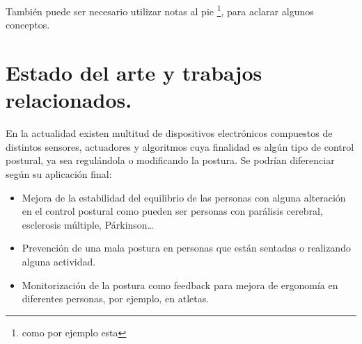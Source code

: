 También puede ser necesario utilizar notas al pie \footnote{como por ejemplo esta}, para aclarar algunos conceptos.


\section{Estado del arte y trabajos relacionados.}

En la actualidad existen multitud de dispositivos electrónicos \cite{dispositivos} compuestos de distintos sensores, actuadores y algoritmos cuya finalidad es algún tipo de control postural, ya sea regulándola o modificando la postura. Se podrían diferenciar según su aplicación final: 
\begin{itemize}
    \item Mejora de la estabilidad del equilibrio de las personas con alguna alteración en el control postural como pueden ser personas con parálisis cerebral, esclerosis múltiple, Párkinson… 

    \item Prevención de una mala postura en personas que están sentadas o realizando alguna actividad. 

    \item Monitorización de la postura como feedback para mejora de ergonomía en diferentes personas, por ejemplo, en atletas\cite{Deportistas_1,Deportistas_2}. 
\end{itemize}

